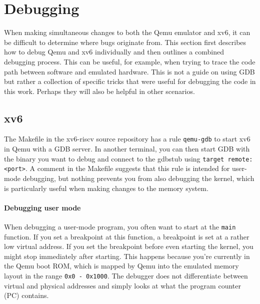 


\section{Debugging}
When making simultaneous changes to both the Qemu emulator and xv6, it can be difficult to determine where bugs originate from. This section first describes how to debug Qemu and xv6 individually and then outlines a combined debugging process. This can be useful, for example, when trying to trace the code path between software and emulated hardware. This is not a guide on using GDB but rather a collection of specific tricks that were useful for debugging the code in this work. Perhaps they will also be helpful in other scenarios.

\subsection{xv6}
The Makefile in the xv6-riscv source repository has a rule \texttt{qemu-gdb} to start xv6 in Qemu with a GDB server. In another terminal, you can then start GDB with the binary you want to debug and connect to the gdbstub using \texttt{target remote:<port>}. A comment in the Makefile suggests that this rule is intended for user-mode debugging, but nothing prevents you from also debugging the kernel, which is particularly useful when making changes to the memory system.

\paragraph{Debugging user mode} When debugging a user-mode program, you often want to start at the \texttt{main} function. If you set a breakpoint at this function, a breakpoint is set at a rather low virtual address. If you set the breakpoint before even starting the kernel, you might stop immediately after starting. This happens because you're currently in the Qemu boot ROM, which is mapped by Qemu into the emulated memory layout in the range \texttt{0x0 - 0x1000}. The debugger does not differentiate between virtual and physical addresses and simply looks at what the program counter (PC) contains. 

